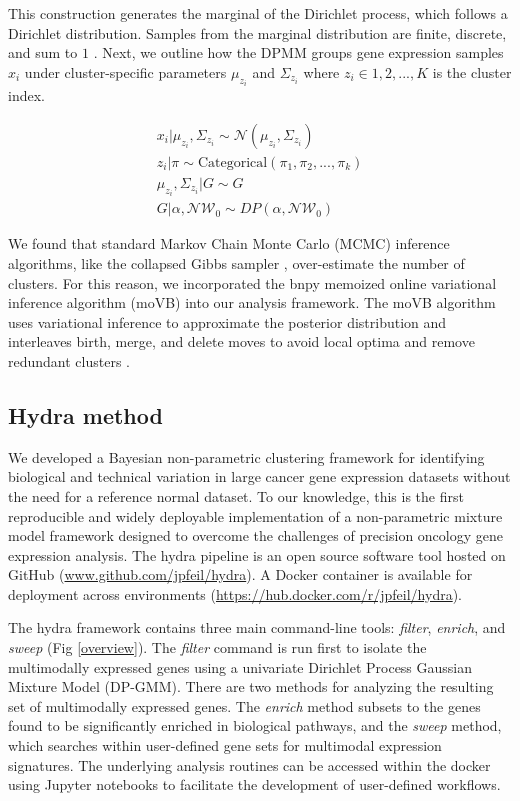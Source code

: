 \documentclass[10pt,letterpaper]{article}
\begin{document}
This construction generates the marginal of the Dirichlet process, which follows a Dirichlet distribution. Samples from the marginal distribution are finite, discrete, and sum to $1$ \cite{fergusonBayesianAnalysisNonparametric1973}. Next, we outline how the DPMM groups gene expression samples $x_i$ under cluster-specific parameters $\mu_{z_i}$ and $\Sigma_{z_i}$ where $z_i \in {1, 2, ..., K}$ is the cluster index.

\begin{gather}
\label{eq:mm}
x_i | \mu_{z_i}, \Sigma_{z_i} \sim \mathcal{N}(\mu_{z_i}, \Sigma_{z_i}) \\
z_i | \pi \sim \text{Categorical}(\pi_1, \pi_2, ..., \pi_k) \\
\mu_{z_i}, \Sigma_{z_i} | G \sim G \\
G | \alpha, \mathcal{NW}_0 \sim DP(\alpha, \mathcal{NW}_0)
\end{gather}

We found that standard Markov Chain Monte Carlo (MCMC) inference algorithms, like the collapsed Gibbs sampler \cite{nealMarkovChainSampling2000, muller2004nonparametric}, over-estimate the number of clusters. For this reason, we incorporated the bnpy memoized online variational inference algorithm (moVB) \cite{hughes2013memoized} into our analysis framework. The moVB algorithm uses variational inference to approximate the posterior distribution and interleaves birth, merge, and delete moves to avoid local optima and remove redundant clusters \cite{hughesBnpyReliableScalable}. 

\subsection*{Hydra method}
We developed a Bayesian non-parametric clustering framework for identifying biological and technical variation in large cancer gene expression datasets without the need for a reference normal dataset. To our knowledge, this is the first reproducible and widely deployable implementation of a non-parametric mixture model framework designed to overcome the challenges of precision oncology gene expression analysis. The hydra pipeline is an open source software tool hosted on GitHub (\url{www.github.com/jpfeil/hydra}). A Docker container is available for deployment across environments (\url{https://hub.docker.com/r/jpfeil/hydra}).

The hydra framework contains three main command-line tools: \textit{filter}, \textit{enrich}, and \textit{sweep} (Fig \ref{overview}). The \textit{filter} command is run first to isolate the multimodally expressed genes using a univariate Dirichlet Process Gaussian Mixture Model (DP-GMM). There are two methods for analyzing the resulting set of multimodally expressed genes. The \textit{enrich} method subsets to the genes found to be significantly enriched in biological pathways, and the \textit{sweep} method, which searches within user-defined gene sets for multimodal expression signatures. The underlying analysis routines can be accessed within the docker using Jupyter notebooks to facilitate the development of user-defined workflows.
\end{document}
